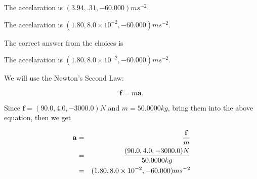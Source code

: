 \documentclass[12pt]{article}
\begin{document}
 
The accelaration is $  %
(
3.94,
.31,
-60.000)
ms^{-2} $.
 
 
\noindent{}
 
 
The accelaration is $  %
(
1.80,
8.0 \times 10^{-2},
-60.000)
ms^{-2} $.
 
 
\noindent{}
 
 
 
 
 
\noindent{}
 
 

The correct answer from the choices is


The accelaration is $  %
(
1.80,
8.0 \times 10^{-2},
-60.000)
ms^{-2} $.
 
 
 
\noindent{}
 
 

 
 
 
\noindent{}
 
 

We will use the Newton's Second Law:
 
\[
\mathbf{f}=m\mathbf{a}.
\]
 
Since $\mathbf{f}= %
(90.0 , 4.0 , -3000.0) N$
and $m= %
50.0000kg$, bring them into the above equation, then we get
 
\begin{eqnarray*}
\mathbf{a}&=&\frac{\mathbf{f}}m  \\
&=&\frac{ %
(90.0 , 4.0 , -3000.0) N}{ %
50.0000kg}  \\
&=& %
(1.80 , 8.0 \times 10^{-2} , -60.000) ms^{-2}
\end{eqnarray*}
 
 
 
\noindent{}
 
 

 
\vspace{0.3in}
   
   
   
\end{document}
